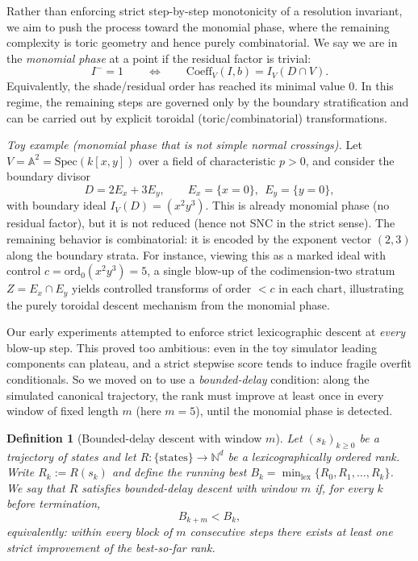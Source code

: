 \documentclass[11pt]{amsart}
\newtheorem{definition}{Definition}
\begin{document}
Rather than enforcing strict step-by-step monotonicity of a resolution invariant, we aim to push the
process toward the monomial phase, where the remaining complexity is toric geometry and hence
purely combinatorial.
We say we are in the \emph{monomial phase} at a point if
the residual factor is trivial:
\[
I^- = 1
\qquad\Longleftrightarrow\qquad
\mathrm{Coeff}_V(I,b)= I_V(D\cap V).
\]
Equivalently, the shade/residual order has reached its minimal value $0$.
In this regime, the remaining steps are governed only by the boundary stratification and can be carried
out by explicit toroidal (toric/combinatorial) transformations.

\smallskip
\noindent\emph{Toy example (monomial phase that is not simple normal crossings).}
Let $V=\mathbb{A}^2=\mathrm{Spec}(k[x,y])$ over a field of characteristic $p>0$, and consider the
boundary divisor
\[
D = 2E_x + 3E_y,\qquad E_x=\{x=0\},\ \ E_y=\{y=0\},
\]
with boundary ideal $I_V(D)=(x^2y^3)$.  This is already monomial phase (no residual factor),
but it is not reduced (hence not SNC in the strict sense).  The remaining behavior is combinatorial:
it is encoded by the exponent vector $(2,3)$ along the boundary strata.  For instance, viewing this as
a marked ideal with control $c=\mathrm{ord}_0(x^2y^3)=5$, a single blow-up of the codimension-two stratum
$Z=E_x\cap E_y$ yields controlled transforms of order $<c$ in each chart, illustrating the purely toroidal
descent mechanism from the monomial phase.

\medskip
Our early experiments attempted to enforce strict lexicographic descent at \emph{every} blow-up step.
This proved too ambitious: even in the toy simulator leading components can plateau, and a strict stepwise
score tends to induce fragile overfit conditionals. So we moved on to use a \emph{bounded-delay} condition: along the simulated canonical trajectory, the rank must improve at
least once in every window of fixed length $m$ (here $m=5$), until the monomial phase is detected.

\begin{definition}[Bounded-delay descent with window $m$]
\label{def:bounded-delay}
Let $(s_k)_{k\ge 0}$ be a trajectory of states and let
$R\colon \{\text{states}\}\to\mathbb{N}^d$ be a lexicographically ordered rank.
Write $R_k:=R(s_k)$ and define the running best $B_k = \min\nolimits_{\mathrm{lex}}\{R_0, R_1, \dots, R_k\}$.
We say that $R$ satisfies \emph{bounded-delay descent with window $m$} if, for every $k$ before termination,
\[
B_{k+m} < B_k,
\]
equivalently: within every block of $m$ consecutive steps there exists at least one strict improvement of
the best-so-far rank.
\end{definition}
\end{document}
